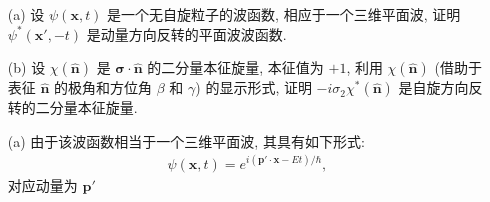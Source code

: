 \documentclass{assignment}
\begin{document}
\begin{prob}[课本习题 4.7]
    \begin{itemize}
        \item[(a)] 设 $\psi(\bm{x},t)$ 是一个无自旋粒子的波函数, 相应于一个三维平面波, 证明 $\psi^*(\bm{x}',-t)$ 是动量方向反转的平面波波函数.
        \item[(b)] 设 $\chi(\hat{\bm{n}})$ 是 $\bm{\sigma}\cdot\hat{\bm{n}}$ 的二分量本征旋量, 本征值为 $+1$, 利用 $\chi(\hat{\bm{n}})$ (借助于表征 $\hat{\bm{n}}$ 的极角和方位角 $\beta$ 和 $\gamma$) 的显示形式, 证明 $-i\sigma_2\chi^*(\hat{\bm{n}})$ 是自旋方向反转的二分量本征旋量.
    \end{itemize}
\end{prob}
\begin{pf}
    \begin{itemize}
        \item[(a)] 由于该波函数相当于一个三维平面波, 其具有如下形式:
        \begin{align}
            \psi(\bm{x},t)=e^{i(\bm{p}'\cdot\bm{x}-Et)/\hbar},
        \end{align}
        对应动量为 $\bm{p}'$


\end{itemize}
\end{pf}
\end{document}
